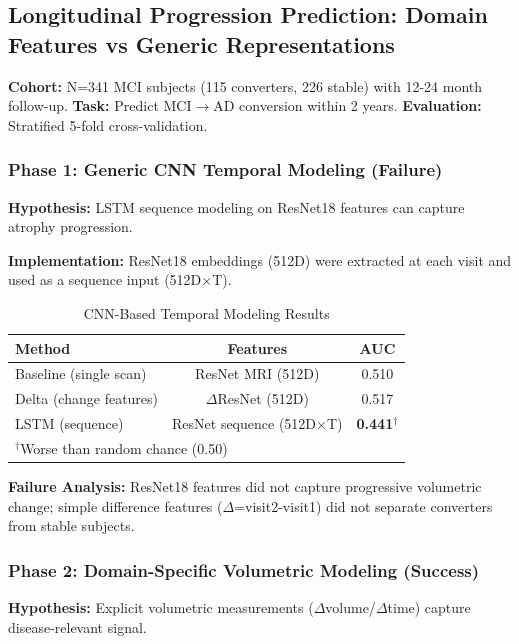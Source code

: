 \documentclass[conference]{IEEEtran}
\begin{document}
\subsection{Longitudinal Progression Prediction: Domain Features vs Generic Representations}

\textbf{Cohort:} N=341 MCI subjects (115 converters, 226 stable) with 12-24 month follow-up.  
\textbf{Task:} Predict MCI$\rightarrow$AD conversion within 2 years.  
\textbf{Evaluation:} Stratified 5-fold cross-validation.

\subsubsection{Phase 1: Generic CNN Temporal Modeling (Failure)}

\textbf{Hypothesis:} LSTM sequence modeling on ResNet18 features can capture atrophy progression.

\textbf{Implementation:} ResNet18 embeddings (512D) were extracted at each visit and used as a sequence input (512D$\times$T).

\begin{table}[h]
\centering
\caption{CNN-Based Temporal Modeling Results}
\label{tab:lstm-fail}
\begin{tabular}{lcc}
\toprule
\textbf{Method} & \textbf{Features} & \textbf{AUC} \\
\midrule
Baseline (single scan) & ResNet MRI (512D) & 0.510 \\
Delta (change features) & $\Delta$ResNet (512D) & 0.517 \\
LSTM (sequence) & ResNet sequence (512D$\times$T) & \textbf{0.441}$^\dagger$ \\
\bottomrule
\multicolumn{3}{l}{\footnotesize $^\dagger$Worse than random chance (0.50)}
\end{tabular}
\end{table}

\textbf{Failure Analysis:} ResNet18 features did not capture progressive volumetric change; simple difference features ($\Delta$=visit2-visit1) did not separate converters from stable subjects.

\subsubsection{Phase 2: Domain-Specific Volumetric Modeling (Success)}

\textbf{Hypothesis:} Explicit volumetric measurements ($\Delta$volume/$\Delta$time) capture disease-relevant signal.
\end{document}

